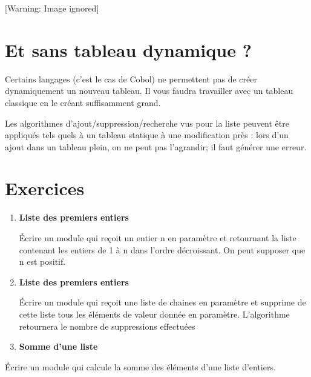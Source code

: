 {\sffamily
\textstyleWWPolicepardfaut{\ \ }\textstyleWWPolicepardfaut{
}}

{\sffamily
{} }


\bigskip

{
}

\begin{center}
 [Warning: Image ignored] %

\end{center}
{
}

\section{Et sans tableau dynamique ?}
{
Certains langages (c’est le cas de Cobol) ne permettent pas de créer
dynamiquement un nouveau tableau. Il vous faudra travailler avec un
tableau classique en le créant suffisamment grand.}

{
Les algorithmes d’ajout/suppression/recherche vus pour la liste peuvent
être appliqués tels quels à un tableau statique à une modification près
: lors d’un ajout dans un tableau plein, on ne peut pas l’agrandir; il
faut générer une erreur.}

\section{Exercices}
\liststyleExercice
\begin{enumerate}
\item {\sffamily\bfseries
Liste des premiers entiers}

{
Écrire un module qui reçoit un entier n en paramètre et retournant la
liste contenant les entiers de 1 à n dans l'ordre
décroissant. On peut supposer que n est positif.}
\item {\sffamily\bfseries
{List}e des premiers entiers}

{
Écrire un module qui reçoit une liste de chaines en paramètre et
supprime de cette liste tous les éléments de valeur donnée en
paramètre. L'algorithme retournera le nombre de
suppressions effectuées}
\item {\sffamily\bfseries
Somme d'une liste}
\end{enumerate}
{
Écrire un module qui calcule la somme des éléments d’une liste
d’entiers.}

